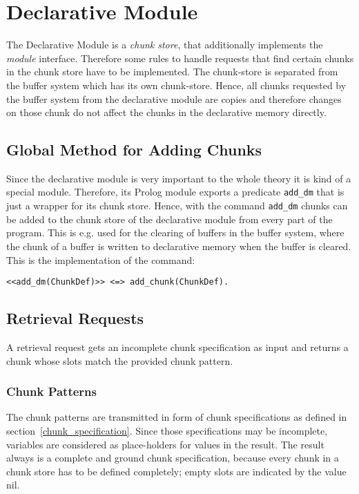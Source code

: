 \section{Declarative Module}

The Declarative Module is a \emph{chunk store}, that additionally implements the \emph{module} interface. Therefore some rules to handle requests that find certain chunks in the chunk store have to be implemented. The chunk-store is separated from the buffer system which has its own chunk-store. Hence, all chunks requested by the buffer system from the declarative module are copies and therefore changes on those chunk do not affect the chunks in the declarative memory directly.

\subsection{Global Method for Adding Chunks}
\label{global_method_for_adding_chunks}

Since the declarative module is very important to the whole theory it is kind of a special module. Therefore, its Prolog module exports a predicate \lstinline|add_dm| that is just a wrapper for its chunk store. Hence, with the command \lstinline|add_dm| chunks can be added to the chunk store of the declarative module from every part of the program. This is e.g. used for the clearing of buffers in the buffer system, where the chunk of a buffer is written to declarative memory when the buffer is cleared. This is the implementation of the command:

\begin{lstlisting}
<<add_dm(ChunkDef)>> <=> add_chunk(ChunkDef).
\end{lstlisting}

\subsection{Retrieval Requests}
\label{retrieval_requests}

A retrieval request gets an incomplete chunk specification as input and returns a chunk whose slots match the provided chunk pattern.

\subsubsection{Chunk Patterns}

\enlargethispage{-\baselineskip}

The chunk patterns are transmitted in form of chunk specifications as defined in section~\ref{chunk_specification}. Since those specifications may be incomplete, variables are considered as place-holders for values in the result. The result always is a complete and ground chunk specification, because every chunk in a chunk store has to be defined completely; empty slots are indicated by the value nil.

